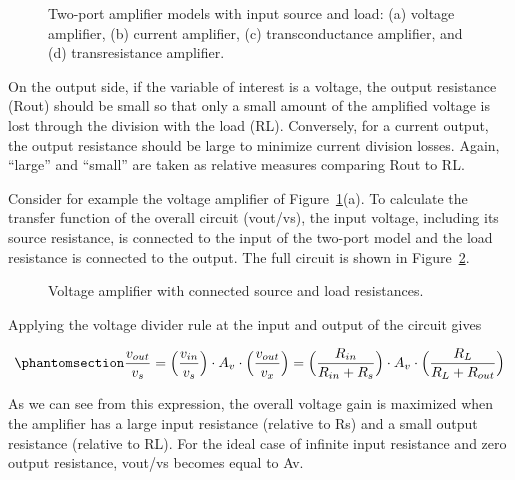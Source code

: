 \documentclass[
  11pt,
  letterpaper,
  abstract]{scrbook}
\begin{document}
\begin{figure}


\caption{\label{fig-1.9}Two-port amplifier models with input source and
load: (a) voltage amplifier, (b) current amplifier, (c) transconductance
amplifier, and (d) transresistance amplifier.}

\end{figure}%

On the output side, if the variable of interest is a voltage, the output
resistance (Rout) should be small so that only a small amount of the
amplified voltage is lost through the division with the load (RL).
Conversely, for a current output, the output resistance should be large
to minimize current division losses. Again, ``large'' and ``small'' are
taken as relative measures comparing Rout to RL.

Consider for example the voltage amplifier of Figure~\ref{fig-1.9}(a).
To calculate the transfer function of the overall circuit (vout/vs), the
input voltage, including its source resistance, is connected to the
input of the two-port model and the load resistance is connected to the
output. The full circuit is shown in Figure~\ref{fig-1.10}.

\begin{figure}


\caption{\label{fig-1.10}Voltage amplifier with connected source and
load resistances.}

\end{figure}%

Applying the voltage divider rule at the input and output of the circuit
gives

\begin{equation}\phantomsection\label{eq-1.1}{
\frac{v_{out}}{v_s} = \Bigl(\frac{v_{in}}{v_s}\Bigr) \cdot A_v \cdot \Bigl(\frac{v_{out}}{v_x}\Bigr) = \Bigl(\frac{R_{in}}{R_{in} + R_s}\Bigr) \cdot A_v \cdot \Bigl(\frac{R_{L}}{R_{L} + R_{out}}\Bigr)
}\end{equation}

As we can see from this expression, the overall voltage gain is
maximized when the amplifier has a large input resistance (relative to
Rs) and a small output resistance (relative to RL). For the ideal case
of infinite input resistance and zero output resistance, vout/vs becomes
equal to Av.
\end{document}
